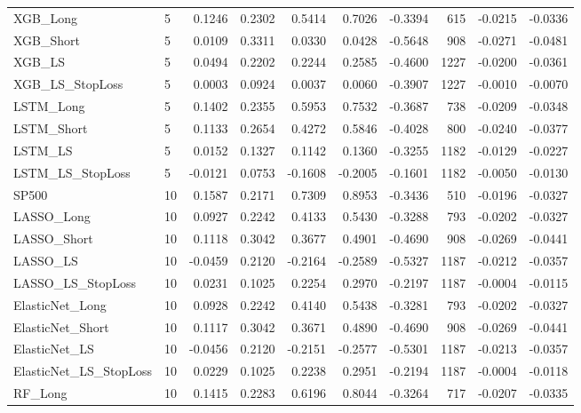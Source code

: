 \begin{tabular}{llrrrrrrrr}
\cline{1-10}
XGB\_Long & 5 & 0.1246 & 0.2302 & 0.5414 & 0.7026 & -0.3394 & 615 & -0.0215 & -0.0336 \\
\cline{1-10}
XGB\_Short & 5 & 0.0109 & 0.3311 & 0.0330 & 0.0428 & -0.5648 & 908 & -0.0271 & -0.0481 \\
\cline{1-10}
XGB\_LS & 5 & 0.0494 & 0.2202 & 0.2244 & 0.2585 & -0.4600 & 1227 & -0.0200 & -0.0361 \\
\cline{1-10}
XGB\_LS\_StopLoss & 5 & 0.0003 & 0.0924 & 0.0037 & 0.0060 & -0.3907 & 1227 & -0.0010 & -0.0070 \\
\cline{1-10}
LSTM\_Long & 5 & 0.1402 & 0.2355 & 0.5953 & 0.7532 & -0.3687 & 738 & -0.0209 & -0.0348 \\
\cline{1-10}
LSTM\_Short & 5 & 0.1133 & 0.2654 & 0.4272 & 0.5846 & -0.4028 & 800 & -0.0240 & -0.0377 \\
\cline{1-10}
LSTM\_LS & 5 & 0.0152 & 0.1327 & 0.1142 & 0.1360 & -0.3255 & 1182 & -0.0129 & -0.0227 \\
\cline{1-10}
LSTM\_LS\_StopLoss & 5 & -0.0121 & 0.0753 & -0.1608 & -0.2005 & -0.1601 & 1182 & -0.0050 & -0.0130 \\
\cline{1-10}
SP500 & 10 & 0.1587 & 0.2171 & 0.7309 & 0.8953 & -0.3436 & 510 & -0.0196 & -0.0327 \\
\cline{1-10}
LASSO\_Long & 10 & 0.0927 & 0.2242 & 0.4133 & 0.5430 & -0.3288 & 793 & -0.0202 & -0.0327 \\
\cline{1-10}
LASSO\_Short & 10 & 0.1118 & 0.3042 & 0.3677 & 0.4901 & -0.4690 & 908 & -0.0269 & -0.0441 \\
\cline{1-10}
LASSO\_LS & 10 & -0.0459 & 0.2120 & -0.2164 & -0.2589 & -0.5327 & 1187 & -0.0212 & -0.0357 \\
\cline{1-10}
LASSO\_LS\_StopLoss & 10 & 0.0231 & 0.1025 & 0.2254 & 0.2970 & -0.2197 & 1187 & -0.0004 & -0.0115 \\
\cline{1-10}
ElasticNet\_Long & 10 & 0.0928 & 0.2242 & 0.4140 & 0.5438 & -0.3281 & 793 & -0.0202 & -0.0327 \\
\cline{1-10}
ElasticNet\_Short & 10 & 0.1117 & 0.3042 & 0.3671 & 0.4890 & -0.4690 & 908 & -0.0269 & -0.0441 \\
\cline{1-10}
ElasticNet\_LS & 10 & -0.0456 & 0.2120 & -0.2151 & -0.2577 & -0.5301 & 1187 & -0.0213 & -0.0357 \\
\cline{1-10}
ElasticNet\_LS\_StopLoss & 10 & 0.0229 & 0.1025 & 0.2238 & 0.2951 & -0.2194 & 1187 & -0.0004 & -0.0118 \\
\cline{1-10}
RF\_Long & 10 & 0.1415 & 0.2283 & 0.6196 & 0.8044 & -0.3264 & 717 & -0.0207 & -0.0335 \\

\end{tabular}
